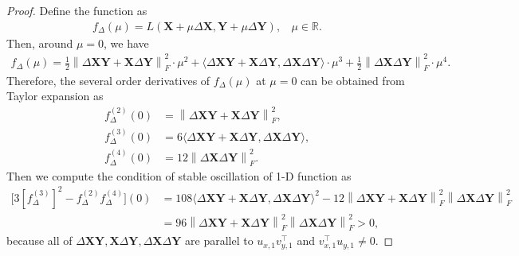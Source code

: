 \documentclass{article}
\theoremstyle{plain}
\theoremstyle{remark}
\newcommand{\norm}[1]{\left\lVert#1\right\rVert}
\def\R{\mathbb{R}}
\begin{document}
\begin{proof}
    Define the function as 
    \begin{align}
        f_{\Delta}(\mu) = L(\mathbf{X}+\mu\Delta\mathbf{X}, \mathbf{Y}+\mu\Delta\mathbf{Y}), ~~~~\mu\in\R.
    \end{align}
    Then, around $\mu=0$, we have
    \begin{align}
        f_{\Delta}(\mu) = \frac{1}{2}\norm{\Delta\mathbf{X}\mathbf{Y} + \mathbf{X}\Delta\mathbf{Y}}_F^2\cdot \mu^2 + \langle \Delta\mathbf{X}\mathbf{Y} + \mathbf{X}\Delta\mathbf{Y}, \Delta\mathbf{X}\Delta\mathbf{Y} \rangle \cdot \mu^3 + 
        \frac{1}{2}\norm{\Delta\mathbf{X}\Delta\mathbf{Y}}_F^2 \cdot \mu^4.
    \end{align}
    Therefore, the several order derivatives of $f_{\Delta}(\mu)$ at $\mu=0$ can be obtained from Taylor expansion as
    \begin{align}
        f^{(2)}_\Delta (0) &= \norm{\Delta\mathbf{X}\mathbf{Y} + \mathbf{X}\Delta\mathbf{Y}}_F^2, \\
        f^{(3)}_\Delta (0) &= 6\langle \Delta\mathbf{X}\mathbf{Y} + \mathbf{X}\Delta\mathbf{Y}, \Delta\mathbf{X}\Delta\mathbf{Y} \rangle, \\
        f^{(4)}_\Delta (0) &= 12\norm{\Delta\mathbf{X}\Delta\mathbf{Y}}_F^2.
    \end{align}
    Then we compute the condition of stable oscillation of 1-D function as
    \begin{align}
        \big[3[f_\Delta^{(3)}]^2 - f_\Delta^{(2)}f_\Delta^{(4)}\big] (0)
        &=
        108 \langle \Delta\mathbf{X}\mathbf{Y} + \mathbf{X}\Delta\mathbf{Y}, \Delta\mathbf{X}\Delta\mathbf{Y} \rangle^2 - 12 \norm{\Delta\mathbf{X}\mathbf{Y} + \mathbf{X}\Delta\mathbf{Y}}_F^2 \norm{\Delta\mathbf{X}\Delta\mathbf{Y}}_F^2 \\
        &= 
        96 \norm{\Delta\mathbf{X}\mathbf{Y} + \mathbf{X}\Delta\mathbf{Y}}_F^2 \norm{\Delta\mathbf{X}\Delta\mathbf{Y}}_F^2 >0,
    \end{align}
    because all of $\Delta\mathbf{X}\mathbf{Y}, \mathbf{X}\Delta\mathbf{Y}, \Delta\mathbf{X}\Delta\mathbf{Y}$ are parallel to $u_{x,1} v_{y,1}^\top$ and $v_{x,1}^\top u_{y,1}\neq 0$.
    
\end{proof}

\end{document}
